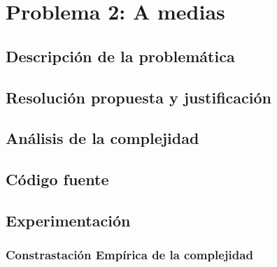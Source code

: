 \section{Problema 2: A medias}

\subsection{Descripci\'on de la problem\'atica}

\subsection{Resoluci\'on propuesta y justificaci\'on}

\subsection{An\'alisis de la complejidad}

\subsection{C\'odigo fuente}

\subsection{Experimentaci\'on}

\subsubsection{Constrastaci\'on Emp\'irica de la complejidad}

